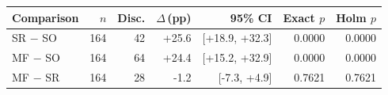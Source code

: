 \begin{tabular}{@{}lrrrrrr@{}}
\toprule
Comparison & $n$ & Disc. & $\Delta$\,(pp) & 95\% CI & Exact $p$ & Holm $p$ \\
\midrule
SR $-$ SO & 164 & 42 & +25.6 & [+18.9, +32.3] & 0.0000 & 0.0000 \\
MF $-$ SO & 164 & 64 & +24.4 & [+15.2, +32.9] & 0.0000 & 0.0000 \\
MF $-$ SR & 164 & 28 & -1.2 & [-7.3, +4.9] & 0.7621 & 0.7621 \\
\bottomrule
\end{tabular}

